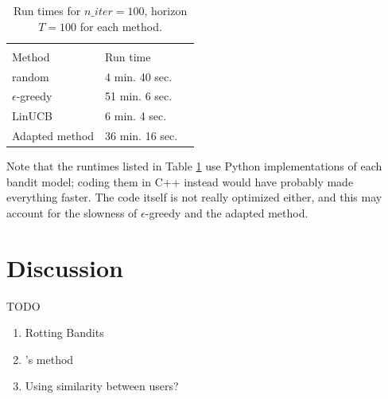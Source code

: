 \documentclass{article}
\begin{document}
\begin{table}[H]
  \caption{Run times for $n\_iter=100$, horizon $T=100$ for each method.}
  \label{runtimes}
  \centering
  \begin{tabular}{lll}
    \multicolumn{2}{c}{}                   \\
    \cmidrule(r){1-2}
    Method     & Run time    \\
    \midrule
    random & 4 min. 40 sec.  \\
    $\epsilon$-greedy & 51 min. 6 sec.  \\
    LinUCB     & 6 min. 4 sec. \\
    Adapted method     & 36 min. 16 sec.       \\
    \bottomrule
  \end{tabular}
\end{table}

Note that the runtimes listed in Table \ref{runtimes} use Python implementations of each bandit model; coding them in C++ instead would have probably made everything faster. The code itself is not really optimized either, and this may account for the slowness of $\epsilon$-greedy and the adapted method.

\section{Discussion}

TODO

\begin{enumerate}
\item Rotting Bandits
\item \cite{abbassi2009getting}'s method
\item Using similarity between users?
\end{enumerate}




\end{document}
